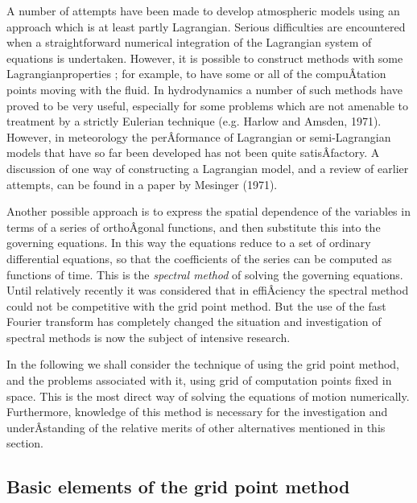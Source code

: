A number of attempts have been made to develop atmospheric models using
an approach which is at least partly Lagrangian. Serious difficulties
are encountered when a straightforward numerical integration of the
Lagrangian system of equations is undertaken. However, it is possible to
construct methods with some Lagrangianproperties ; for example, to have
some or all of the compuÂ­tation points moving with the fluid. In
hydrodynamics a number of such methods have proved to be very useful,
especially for some problems which are not amenable to treatment by a
strictly Eulerian technique (e.g. Harlow and Amsden, 1971). However, in
meteorology the perÂ­formance of Lagrangian or semi-Lagrangian models
that have so far been developed has not been quite satisÂ­factory. A
discussion of one way of constructing a Lagrangian model, and a review
of earlier attempts, can be found in a paper by Mesinger (1971).

Another possible approach is to express the spatial dependence of the
variables in terms of a series of orthoÂ­gonal functions, and then
substitute this into the governing equations. In this way the equations
reduce to a set of ordinary differential equations, so that the
coefficients of the series can be computed as functions of time. This is
the \emph{spectral method} of solving the governing equations. Until
relatively recently it was considered that in effiÂ­ciency the spectral
method could not be competitive with the grid point method. But the use
of the fast Fourier transform has completely changed the situation and
investigation of spectral methods is now the subject of intensive
research.

In the following we shall consider the technique of using the grid point
method, and the problems associated with it, using grid of computation
points fixed in space. This is the most direct way of solving the
equations of motion numerically. Furthermore, knowledge of this method
is necessary for the investigation and underÂ­standing of the relative
merits of other alternatives mentioned in this section.

\subsection{\texorpdfstring{\textbf{Basic elements of the grid point
method}}{Basic elements of the grid point method}}\label{basic-elements-of-the-grid-point-method}

